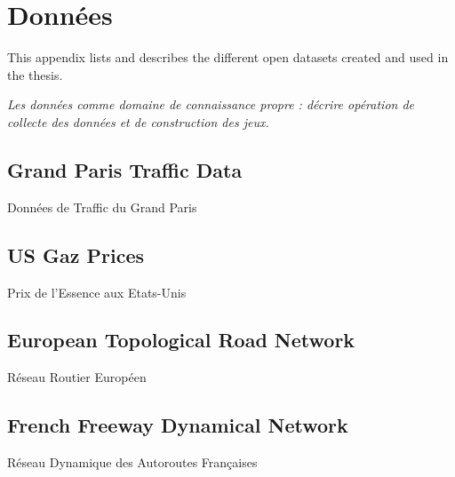 \chapter{Données}

\label{app:data} %



\headercit{}{}{}



This appendix lists and describes the different open datasets created and used in the thesis.


\textit{Les données comme domaine de connaissance propre : décrire opération de collecte des données et de construction des jeux.}

\section{Grand Paris Traffic Data}{Données de Traffic du Grand Paris}





\section{US Gaz Prices}{Prix de l'Essence aux Etats-Unis}




\section{European Topological Road Network}{Réseau Routier Européen}




\section{French Freeway Dynamical Network}{Réseau Dynamique des Autoroutes Françaises}




